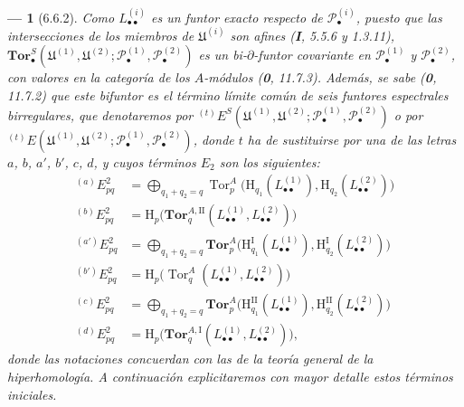 \documentclass[10pt,oneside,openany]{book}
\theoremstyle{egaenv}\newtheorem*{env}{---}
\theoremstyle{egastatement}
\theoremstyle{egadescription}
\newcommand{\oldpage}[2][]{\marginnote{\normalfont\scriptsize\textbf{#1}\,|\,#2}\ignorespaces}
\begin{document}
\begin{env}[6.6.2]
Como $L_{\bullet\bullet}^{(i)}$ es un funtor exacto respecto de
$\mathscr P_\bullet^{(i)}$, puesto que las intersecciones de los miembros
\oldpage[III]{154}
de $\mathfrak U^{(i)}$ son afines (\textbf I, 5.5.6 y 1.3.11),
$\mathbf{Tor}_\bullet^S
(\mathfrak U^{(1)},\mathfrak U^{(2)};
 \mathscr P_\bullet^{(1)},\mathscr P_\bullet^{(2)})$ es un
\emph{bi-$\partial$-funtor covariante} en $\mathscr P_\bullet^{(1)}$ y
$\mathscr P_\bullet^{(2)}$, con valores en la categoría de los $A$-módulos
(\textbf{0}, 11.7.3). Además, se sabe (\textbf{0}, 11.7.2) que este
bifuntor es el término límite común de seis funtores espectrales \emph{birregulares},
que denotaremos por
${}^{(t)}E^S
(\mathfrak U^{(1)},\mathfrak U^{(2)};
\mathscr P_\bullet^{(1)},\mathscr P_\bullet^{(2)})$
o por
${}^{(t)}E
(\mathfrak U^{(1)},\mathfrak U^{(2)};
\mathscr P_\bullet^{(1)},\mathscr P_\bullet^{(2)})$,
donde $t$ ha de sustituirse por una de las letras $a$, $b$, $a'$, $b'$, $c$,
$d$, y cuyos términos $E_2$ son los siguientes:
\[
\begin{aligned}
  {}^{(a)}E_{pq}^2
  &=\bigoplus_{q_1+q_2=q}
    \operatorname{Tor}_p^A
    \bigl(\mathrm H_{q_1}(L_{\bullet\bullet}^{(1)}),
          \mathrm H_{q_2}(L_{\bullet\bullet}^{(2)})\bigr)\\
  {}^{(b)}E_{pq}^2
  &=\mathrm H_p\bigl(
    \mathbf{Tor}_q^{A,\mathrm{II}}
    (L_{\bullet\bullet}^{(1)},L_{\bullet\bullet}^{(2)})\bigr)\\
  {}^{(a')}E_{pq}^2
  &=\bigoplus_{q_1+q_2=q}
    \mathbf{Tor}_p^A
    \bigl(\mathrm H_{q_1}^{\mathrm I}(L_{\bullet\bullet}^{(1)}),
          \mathrm H_{q_2}^{\mathrm I}(L_{\bullet\bullet}^{(2)})\bigr)\\
  {}^{(b')}E_{pq}^2
  &=\mathrm H_p\bigl(
    \operatorname{Tor}_q^A
    (L_{\bullet\bullet}^{(1)},L_{\bullet\bullet}^{(2)})\bigr)\\
  {}^{(c)}E_{pq}^2
  &=\bigoplus_{q_1+q_2=q}
    \mathbf{Tor}_p^A
    \bigl(\mathrm H_{q_1}^{\mathrm{II}}(L_{\bullet\bullet}^{(1)}),
          \mathrm H_{q_2}^{\mathrm{II}}(L_{\bullet\bullet}^{(2)})\bigr)\\
  {}^{(d)}E_{pq}^2
  &=\mathrm H_p\bigl(
    \mathbf{Tor}_q^{A,\mathrm I}
    (L_{\bullet\bullet}^{(1)},L_{\bullet\bullet}^{(2)})\bigr),
\end{aligned}
\]
donde las notaciones concuerdan con las de la teoría general de la
hiperhomología. A continuación explicitaremos con mayor detalle estos términos
iniciales.
\end{env}
\end{document}
